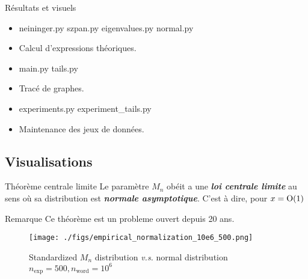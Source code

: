 \begin{frame}
	\begin{block}{Résultats et visuels}
		\begin{itemize}
			\item[] {\color{gray} neininger.py  szpan.py  eigenvalues.py  normal.py} 
			\item[] \quad Calcul d'expressions théoriques.
			\item[] {\color{gray} main.py  tails.py} 
			\item[] \quad Tracé de graphes.
			\item[] {\color{gray} experiments.py  experiment\_tails.py} 
			\item[] \quad Maintenance des jeux de données.
		\end{itemize}
	\end{block}
\end{frame}


\subsection{Visualisations}

\begin{frame}
	\begin{block}{Théorème
		centrale limite}
        Le paramètre $M_n$ obéit a une 
		\emph{\bfseries loi centrale limite} au sens où 
		sa distribution est \emph{\bfseries normale asymptotique}.
        C'est à dire, pour $x = \grando(1)$
        
	\end{block}
	
	\begin{block}{Remarque}
		\label{rmk:clt}
		Ce théorème
		est un probleme ouvert depuis 20 ans.
	\end{block}
\end{frame}

\begin{frame}
	\begin{figure}
		\centering
		\texttt{[image: ./figs/empirical\_normalization\_10e6\_500.png]}
		\centering
		\captionsetup{justification=centering,margin=2cm}
		\caption{Standardized $M_n$ distribution \textit{v.s.} normal distribution\\
			$n_{\text{exp}} = 500, n_{\text{word}} = 10^6$}
		\label{fig:normalized}
	\end{figure}
\end{frame}

